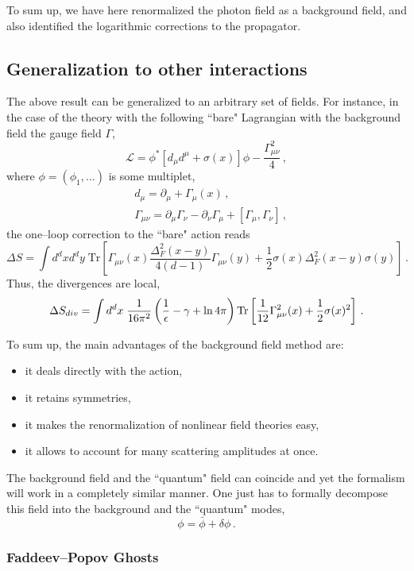 \documentclass[12pt]{article}
\newcommand{\be}{\begin{equation}}
\newcommand{\ee}{\end{equation}}
\newcommand\m{\mu}
\newcommand\g{\gamma}
\newcommand\G{\Gamma}
\newcommand\n{\nu}
\def\d{\partial}
\renewcommand{\ln}{\mathop{\rm ln}\nolimits}
\begin{document}
To sum up, we have here renormalized the photon field as a background field, and also identified the logarithmic corrections to the propagator.

\subsection{Generalization to other interactions}

The above result can be generalized to an arbitrary set of fields.
For instance, in the case of the theory with the following ``bare" Lagrangian with the background field the
gauge field $\G$,
\be
\label{eq:bfgen}
\mathcal{L}=\phi^*[d_\m d^\m+\sigma(x)]\phi -\frac{\Gamma_{\m\n}^2}{4} \,,
\ee
where $\phi=(\phi_1,...)$ is some multiplet,
\be
\label{eq:bfgen2}
\begin{split}
& d_\mu=\d_\mu +\Gamma_\mu (x)\,,\\
& \Gamma_{\m \n} =\d_\m \Gamma_\n-\d_\n \G_\m +\left[\G_\m,\G_\n \right]\,,
\end{split}
\ee
the one--loop correction to the ``bare" action reads
\be
\label{eq:bfgen3}
\Delta S=\int d^dx d^dy \; \text{Tr}\left[
\G_{\m \n}(x)\frac{\Delta_F^2(x-y)}{4(d-1)}\G_{\m \n}(y)+\frac{1}{2}\sigma(x)\Delta_F^2(x-y)\sigma(y)
\right] \,.
\ee
Thus, the divergences are local,
\be
\label{eq:bfgen4}
\Delta S_{div}=\int d^dx \; \frac{1}{16\pi^2}\left(\frac{1}{\epsilon}
-\g+\ln 4\pi
\right)\text{Tr}\left[
\frac{1}{12}\G_{\m \n}^2(x)+\frac{1}{2}\sigma(x)^2
\right] \,.
\ee

To sum up, the main advantages of the background field method are:
\begin{itemize}
\item it deals directly with the action,
\item it retains symmetries,
\item it makes the renormalization of nonlinear field theories easy,
\item it allows to account for many scattering amplitudes at once.
\end{itemize}

The background field and the ``quantum"
field can coincide and yet the formalism will work in a completely
similar manner. One just has to formally decompose this field into the background
and the ``quantum" modes,
\be
\phi=\bar \phi+\delta \phi\,.
\ee



\subsubsection{Faddeev--Popov Ghosts}
\end{document}
